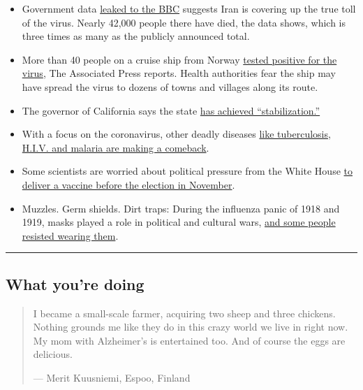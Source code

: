 \begin{itemize}
\item
  Government data
  \href{https://www.bbc.com/news/world-middle-east-53598965}{leaked to
  the BBC} suggests Iran is covering up the true toll of the virus.
  Nearly 42,000 people there have died, the data shows, which is three
  times as many as the publicly announced total.
\item
  More than 40 people on a cruise ship from Norway
  \href{https://news.yahoo.com/outbreak-hits-norway-cruise-ship-101611509.html}{tested
  positive for the virus}, The Associated Press reports. Health
  authorities fear the ship may have spread the virus to dozens of towns
  and villages along its route.
\item
  The governor of California says the state
  \href{https://www.nytimes.com/2020/08/03/world/coronavirus-covid-19.html?action=click\&module=Top\%20Stories\&pgtype=Homepage\#link-450dc05c}{has
  achieved ``stabilization.''}
\item
  With a focus on the coronavirus, other deadly diseases
  \href{https://www.nytimes.com/2020/08/03/health/coronavirus-tuberculosis-aids-malaria.html}{like
  tuberculosis, H.I.V. and malaria are making a comeback}.
\item
  Some scientists are worried about political pressure from the White
  House
  \href{https://www.nytimes.com/2020/08/02/us/politics/coronavirus-vaccine.html}{to
  deliver a vaccine before the election in November}.
\item
  Muzzles. Germ shields. Dirt traps: During the influenza panic of 1918
  and 1919, masks played a role in political and cultural wars,
  \href{https://www.nytimes.com/2020/08/03/us/mask-protests-1918.html}{and
  some people resisted wearing them}.
\end{itemize}

\begin{center}\rule{0.5\linewidth}{\linethickness}\end{center}

\hypertarget{what-youre-doing}{%
\subsection{What you're doing}\label{what-youre-doing}}

\begin{quote}
I became a small-scale farmer, acquiring two sheep and three chickens.
Nothing grounds me like they do in this crazy world we live in right
now. My mom with Alzheimer's is entertained too. And of course the eggs
are delicious.

--- Merit Kuusniemi, Espoo, Finland
\end{quote}

